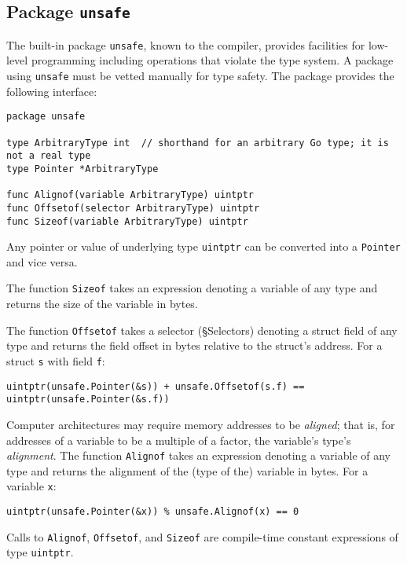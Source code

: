 \subsection*{Package \texttt{unsafe}}

The built-in package \texttt{unsafe}, known to the compiler, provides
facilities for low-level programming including operations that violate
the type system. A package using \texttt{unsafe} must be vetted manually
for type safety. The package provides the following interface:

\begin{Verbatim}[frame=single]
package unsafe

type ArbitraryType int  // shorthand for an arbitrary Go type; it is not a real type
type Pointer *ArbitraryType

func Alignof(variable ArbitraryType) uintptr
func Offsetof(selector ArbitraryType) uintptr
func Sizeof(variable ArbitraryType) uintptr
\end{Verbatim}

Any pointer or value of underlying type
\texttt{uintptr} can be converted into a \texttt{Pointer} and vice
versa.

The function \texttt{Sizeof} takes an expression denoting a variable of
any type and returns the size of the variable in bytes.

The function \texttt{Offsetof} takes a selector
(§Selectors) denoting a struct field of any type
and returns the field offset in bytes relative to the struct's address.
For a struct \texttt{s} with field \texttt{f}:

\begin{Verbatim}[frame=single]
uintptr(unsafe.Pointer(&s)) + unsafe.Offsetof(s.f) == uintptr(unsafe.Pointer(&s.f))
\end{Verbatim}

Computer architectures may require memory addresses to be
\emph{aligned}; that is, for addresses of a variable to be a multiple of
a factor, the variable's type's \emph{alignment}. The function
\texttt{Alignof} takes an expression denoting a variable of any type and
returns the alignment of the (type of the) variable in bytes. For a
variable \texttt{x}:

\begin{Verbatim}[frame=single]
uintptr(unsafe.Pointer(&x)) % unsafe.Alignof(x) == 0
\end{Verbatim}

Calls to \texttt{Alignof}, \texttt{Offsetof}, and \texttt{Sizeof} are
compile-time constant expressions of type \texttt{uintptr}.

